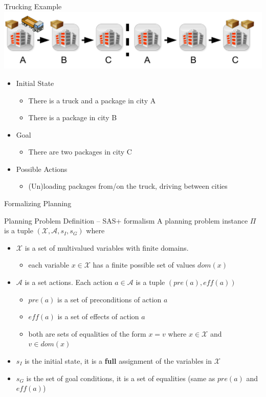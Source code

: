 \documentclass[t]{sdqbeamer}
\begin{document}
\begin{frame}{Trucking Example}
\includegraphics[scale=0.65]{figures/l10/plan-example.pdf}
\begin{itemize}
	\item Initial State
	\begin{itemize}
	\item There is a truck and a package in city A
	\item There is a package in city B
	\end{itemize}
	\item Goal
	\begin{itemize}
	\item There are two packages in city C
	\end{itemize}
	\item Possible Actions
	\begin{itemize}
	\item (Un)loading packages from/on the truck, driving between cities
	\end{itemize}
\end{itemize}
\end{frame}

\begin{frame}{Formalizing Planning}
\begin{block}{Planning Problem Definition -- SAS+ formalism}
A planning problem instance $\Pi$ is a tuple $(\mathcal{X}, \mathcal{A}, s_I, s_G)$ where
\begin{itemize}
	\item $\mathcal{X}$ is a set of multivalued variables with finite domains.
	\begin{itemize}
	\item each variable $x\in \mathcal{X}$ has a finite possible set of values $dom(x)$
	\end{itemize}
	\item $\mathcal{A}$ is a set actions. Each action $a\in\mathcal{A}$ is a tuple $(pre(a),eff(a))$
	\begin{itemize}
	\item $pre(a)$ is a set of preconditions of action $a$
	\item $eff(a)$ is a set of effects of action $a$
	\item both are sets of equalities of the form $x=v$ where $x\in\mathcal{X}$ and $v\in dom(x)$	
	\end{itemize}
	\item $s_I$ is the initial state, it is a \textbf{full} assignment of the variables in $\mathcal{X}$
	\item $s_G$ is the set of goal conditions, it is a set of equalities (same as $pre(a)$ and $eff(a)$)
\end{itemize}
\end{block}
\end{frame}
\end{document}
